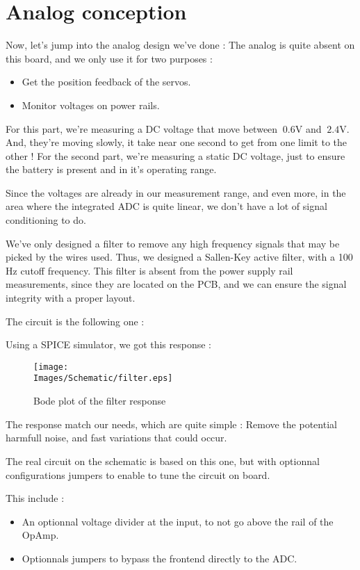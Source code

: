 \section{Analog conception}
Now, let's jump into the analog design we've done : 
The analog is quite absent on this board, and we only use it for two purposes :

\begin{itemize}[noitemsep]
    \item   Get the position feedback of the servos.
    \item   Monitor voltages on power rails. 
\end{itemize}

For this part, we're measuring a DC voltage that move between $~0.6 \si{\volt}$
and $~2.4 \si{\volt}$. And, they're moving slowly, it take near one second to get
from one limit to the other ! For the second part, we're measuring a static DC voltage,
just to ensure the battery is present and in it's operating range.

Since the voltages are already in our measurement range, and even more, in the area
where the integrated ADC is quite linear, we don't have a lot of signal conditioning
to do.

We've only designed a filter to remove any high frequency signals that may be picked
by the wires used. Thus, we designed a Sallen-Key active filter, with a 100 Hz cutoff
frequency. This filter is absent from the power supply rail measurements, since they
are located on the PCB, and we can ensure the signal integrity with a proper layout.

The circuit is the following one :


Using a SPICE simulator, we got this response :
\begin{figure}[!hbt]
    \centering
    \texttt{[image: \\Images/Schematic/filter.eps]}
    \caption{Bode plot of the filter response}
\end{figure}
\FloatBarrier

The response match our needs, which are quite simple : Remove the potential harmfull noise,
and fast variations that could occur. 

The real circuit on the schematic is based on this one, but with optionnal configurations
jumpers to enable to tune the circuit on board.

This include : 
\begin{itemize}[noitemsep]
    \item   An optionnal voltage divider at the input, to not go above the rail of the OpAmp.
    \item   Optionnals jumpers to bypass the frontend directly to the ADC.
\end{itemize}